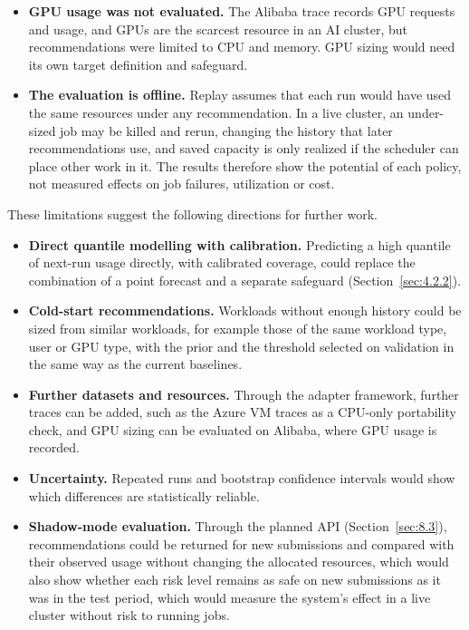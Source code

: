 \begin{itemize}
\item
  \textbf{GPU usage was not evaluated.} The Alibaba trace records GPU requests and usage, and GPUs are the scarcest resource in an AI cluster, but recommendations were limited to CPU and memory. GPU sizing would need its own target definition and safeguard.
\item
  \textbf{The evaluation is offline.} Replay assumes that each run would have used the same resources under any recommendation. In a live cluster, an under-sized job may be killed and rerun, changing the history that later recommendations use, and saved capacity is only realized if the scheduler can place other work in it. The results therefore show the potential of each policy, not measured effects on job failures, utilization or cost.
\end{itemize}

These limitations suggest the following directions for further work.

\begin{itemize}
\tightlist
\item
  \textbf{Direct quantile modelling with calibration.} Predicting a high quantile of next-run usage directly, with calibrated coverage, could replace the combination of a point forecast and a separate safeguard (Section~\ref{sec:4.2.2}).
\item
  \textbf{Cold-start recommendations.} Workloads without enough history could be sized from similar workloads, for example those of the same workload type, user or GPU type, with the prior and the threshold selected on validation in the same way as the current baselines.
\item
  \textbf{Further datasets and resources.} Through the adapter framework, further traces can be added, such as the Azure VM traces as a CPU-only portability check, and GPU sizing can be evaluated on Alibaba, where GPU usage is recorded.
\item
  \textbf{Uncertainty.} Repeated runs and bootstrap confidence intervals would show which differences are statistically reliable.
\item
  \textbf{Shadow-mode evaluation.} Through the planned API (Section~\ref{sec:8.3}), recommendations could be returned for new submissions and compared with their observed usage without changing the allocated resources, which would also show whether each risk level remains as safe on new submissions as it was in the test period, which would measure the system's effect in a live cluster without risk to running jobs.
\end{itemize}
